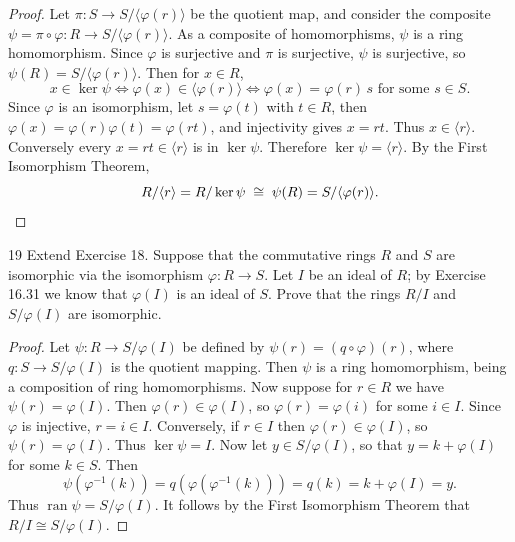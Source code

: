 \begin{proof}
    Let $\pi : S \to S/\langle \varphi(r) \rangle$ be the quotient map, and consider the
        composite $\psi = \pi \circ \varphi : R \to S/\langle \varphi(r) \rangle$.
    As a composite of homomorphisms, $\psi$ is a ring homomorphism.
    Since $\varphi$ is surjective and $\pi$ is surjective, $\psi$ is surjective, so $\psi(R) = S/\langle \varphi(r) \rangle$.
   Then for $x \in R$,
    \[
        x \in \ker\psi \iff \varphi(x) \in \langle \varphi(r) \rangle
            \iff \varphi(x) = \varphi(r)\,s \text{ for some } s \in S.
    \]
    Since $\varphi$ is an isomorphism, let $s = \varphi(t)$ with $t \in R$, then
        $\varphi(x) = \varphi(r)\varphi(t) = \varphi(rt)$, and injectivity gives $x = rt$.
    Thus $x \in \langle r \rangle$. Conversely every $x = rt \in \langle r \rangle$ is in $\ker\psi$.
    Therefore $\ker\psi = \langle r \rangle$.
    By the First Isomorphism Theorem,
    \[
        R/\langle r \rangle = R/\ker\psi \;\cong\; \psi(R) = S/\langle \varphi(r) \rangle. \qedhere
    \]
\end{proof}

\begin{problem}{19}
Extend Exercise 18. Suppose that the commutative rings $R$ and $S$ are isomorphic via the isomorphism $\varphi : R \to S$. Let $I$ be an ideal of $R$; by Exercise 16.31 we know that $\varphi(I)$ is an ideal of $S$. Prove that the rings $R/I$ and $S/\varphi(I)$ are isomorphic.
\end{problem}
\solved

\begin{proof}
    Let $\psi : R \longrightarrow S/\varphi(I)$ be defined by $\psi(r) = (q \circ \varphi)(r)$,
    where $q : S \longrightarrow S/\varphi(I)$ is the quotient mapping.
    Then $\psi$ is a ring homomorphism, being a composition of ring homomorphisms.
    Now suppose for $r \in R$ we have $\psi(r) = \varphi(I)$.
    Then $\varphi(r) \in \varphi(I)$, so $\varphi(r) = \varphi(i)$ for some $i \in I$.
    Since $\varphi$ is injective, $r = i \in I$.
    Conversely, if $r \in I$ then $\varphi(r) \in \varphi(I)$, so $\psi(r) = \varphi(I)$.
    Thus $\ker \psi = I$.
    Now let $y \in S/\varphi(I)$, so that $y = k + \varphi(I)$ for some $k \in S$. Then
    \[\psi(\varphi^{-1}(k)) = q(\varphi(\varphi^{-1}(k))) = q(k) = k + \varphi(I) = y.\]
    Thus $\operatorname{ran} \psi = S/\varphi(I)$. It follows by the First Isomorphism Theorem that
    $R/I \cong S/\varphi(I)$.
\end{proof}

